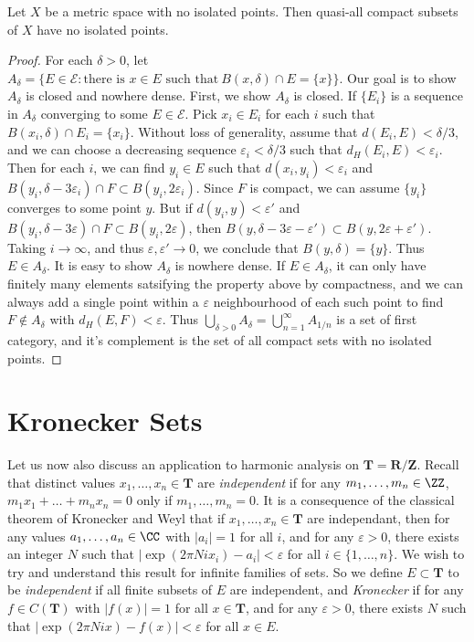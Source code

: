 \begin{theorem}
	Let $X$ be a metric space with no isolated points. Then quasi-all compact subsets of $X$ have no isolated points.
\end{theorem}
\begin{proof}
	For each $\delta > 0$, let $A_\delta = \{ E \in \mathcal{E}: \text{there is $x \in E$ such that}\ B(x,\delta) \cap E = \{ x \} \}$. Our goal is to show $A_\delta$ is closed and nowhere dense. First, we show $A_\delta$ is closed. If $\{ E_i \}$ is a sequence in $A_\delta$ converging to some $E \in \mathcal{E}$. Pick $x_i \in E_i$ for each $i$ such that $B(x_i,\delta) \cap E_i = \{ x_i \}$. Without loss of generality, assume that $d(E_i, E) < \delta / 3$, and we can choose a decreasing sequence $\varepsilon_i < \delta / 3$ such that $d_H(E_i,E) < \varepsilon_i$. Then for each $i$, we can find $y_i \in E$ such that $d(x_i,y_i) < \varepsilon_i$ and $B(y_i,\delta - 3 \varepsilon_i) \cap F \subset B(y_i,2\varepsilon_i)$. Since $F$ is compact, we can assume $\{ y_i \}$ converges to some point $y$. But if $d(y_i,y) < \varepsilon'$ and $B(y_i,\delta - 3\varepsilon) \cap F \subset B(y_i,2\varepsilon)$, then $B(y,\delta-3\varepsilon - \varepsilon') \subset B(y,2\varepsilon + \varepsilon')$. Taking $i \to \infty$, and thus $\varepsilon, \varepsilon' \to 0$, we conclude that $B(y,\delta) = \{ y \}$. Thus $E \in A_\delta$. It is easy to show $A_\delta$ is nowhere dense. If $E \in A_\delta$, it can only have finitely many elements satsifying the property above by compactness, and we can always add a single point within a $\varepsilon$ neighbourhood of each such point to find $F \not \in A_\delta$ with $d_H(E,F) < \varepsilon$. Thus $\bigcup_{\delta > 0} A_\delta = \bigcup_{n = 1}^\infty A_{1/n}$ is a set of first category, and it's complement is the set of all compact sets with no isolated points.
\end{proof}

\section{Kronecker Sets}

Let us now also discuss an application to harmonic analysis on $\mathbf{T} = \mathbf{R}/\mathbf{Z}$. Recall that distinct values $x_1, \dots, x_n \in \mathbf{T}$ are \emph{independent} if for any $m_1, \dots, m_n \in \ZZ$, $m_1 x_1 + \dots + m_n x_n = 0$ only if $m_1, \dots, m_n = 0$. It is a consequence of the classical theorem of Kronecker and Weyl that if $x_1, \dots, x_n \in \mathbf{T}$ are independant, then for any values $a_1, \dots, a_n \in \CC$ with $|a_i| = 1$ for all $i$, and for any $\varepsilon > 0$, there exists an integer $N$ such that $|\exp(2 \pi Nix_i) - a_i| < \varepsilon$ for all $i \in \{ 1, \dots, n \}$. We wish to try and understand this result for infinite families of sets. So we define $E \subset \mathbf{T}$ to be \emph{independent} if all finite subsets of $E$ are independent, and \emph{Kronecker} if for any $f \in C(\mathbf{T})$ with $|f(x)| = 1$ for all $x \in \mathbf{T}$, and for any $\varepsilon > 0$, there exists $N$ such that $|\exp(2 \pi Nix) - f(x)| < \varepsilon$ for all $x \in E$.

